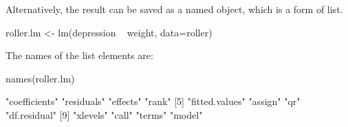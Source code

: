Alternatively, the result can be saved as a named object,
which is a form of list.
\begin{Schunk}
\begin{Sinput}
roller.lm <- lm(depression ~ weight, data=roller)
\end{Sinput}
\end{Schunk}

The names of the list elements are:
\begin{Schunk}
\begin{Sinput}
names(roller.lm)
\end{Sinput}
\begin{Soutput}
 [1] "coefficients"  "residuals"     "effects"       "rank"         
 [5] "fitted.values" "assign"        "qr"            "df.residual"  
 [9] "xlevels"       "call"          "terms"         "model"        
\end{Soutput}
\end{Schunk}

